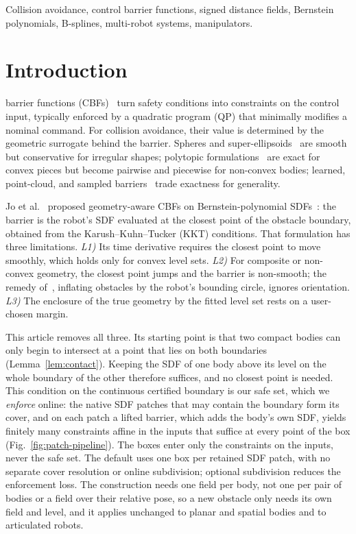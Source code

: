 \documentclass[journal]{IEEEtran}
\theoremstyle{definition}
\begin{document}
\begin{IEEEkeywords}
Collision avoidance, control barrier functions, signed distance fields, Bernstein polynomials,
B-splines, multi-robot systems, manipulators.
\end{IEEEkeywords}

\section{Introduction}\label{sec:intro}

 barrier functions (CBFs)~\cite{ames2019cbf} turn safety conditions into
constraints on the control input, typically enforced by a quadratic program (QP) that minimally
modifies a nominal command. For collision avoidance, their value is determined by the geometric
surrogate behind the barrier. Spheres and super-ellipsoids~\cite{wang2017safety,wang2017quadrotors}
are smooth but conservative for irregular shapes; polytopic
formulations~\cite{chen2025minkowski,thirugnanam2025strongly} are exact for convex pieces but become
pairwise and piecewise for non-convex bodies; learned, point-cloud, and sampled
barriers~\cite{khan2022gaussian,long2021learning,dai2024sailing,lutkus2025sampling} trade exactness
for generality.

Jo et al.~\cite{jo2026geometry} proposed geometry-aware CBFs on Bernstein-polynomial
SDFs~\cite{li2024representing}: the barrier is the robot's SDF evaluated at the closest point of the
obstacle boundary, obtained from the Karush--Kuhn--Tucker (KKT) conditions. That formulation has
three limitations. \emph{L1)} Its time derivative requires the closest point to move smoothly, which
holds only for convex level sets. \emph{L2)} For composite or non-convex geometry, the closest point
jumps and the barrier is non-smooth; the remedy of~\cite{jo2026geometry}, inflating obstacles by
the robot's bounding circle, ignores orientation. \emph{L3)} The enclosure of the true geometry by
the fitted level set rests on a user-chosen margin.

This article removes all three. Its starting point is that two compact bodies can only begin to
intersect at a point that lies on both boundaries (Lemma~\ref{lem:contact}). Keeping the SDF of one
body above its level on the whole boundary of the other therefore suffices, and no closest point is
needed. This condition on the continuous certified boundary is our safe set, which we
\emph{enforce} online: the native SDF patches that may contain the boundary form its cover, and on each patch a lifted
barrier, which adds the body's own SDF, yields finitely many constraints affine in the inputs that
suffice at every point of the box (Fig.~\ref{fig:patch-pipeline}). The boxes enter only the constraints on
the inputs, never the safe set. The default uses one box per retained SDF patch, with no separate
cover resolution or online subdivision; optional subdivision reduces the enforcement loss. The construction
needs one field per body, not one per pair of bodies or a field over their relative pose, so a new
obstacle only needs its own field and level, and it applies unchanged to planar and spatial bodies
and to articulated robots.
\end{document}
